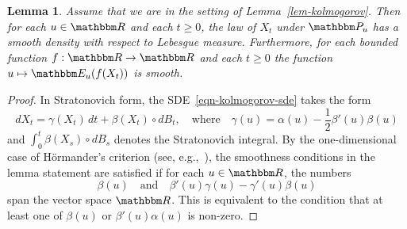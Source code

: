 \documentclass[11pt]{article}
\theoremstyle{plain}
\newtheorem{lem}[thm]{Lemma}
\theoremstyle{definition}
\numberwithin{equation}{section}
\newcommand{\eqb}{\begin{equation}}
\newcommand{\eqe}{\end{equation}}
\newcommand{\eqbn}{\begin{equation*}}
\newcommand{\eqen}{\end{equation*}}
\newcommand{\BB}{\mathbbm}
\newcommand{\rta}{\rightarrow}
\begin{document}
\begin{lem} \label{lem-hormander} 
Assume that we are in the setting of Lemma~\ref{lem-kolmogorov}. 
Then for each $u \in\BB R$ and each $t\geq 0$, the law of $X_t$ under $\BB P_u$ has a smooth density with respect to Lebesgue measure. 
Furthermore, for each bounded function $f : \BB R\rta \BB R$ and each $t\geq 0$ the function $u\mapsto \BB E_u( f(X_t))$ is smooth. 
\end{lem}
\begin{proof}
In Stratonovich form, the SDE~\eqref{eqn-kolmogorov-sde} takes the form
\eqb \label{eqn-stratanovich}
dX_t = \gamma(X_t) \,dt + \beta(X_t) \circ dB_t , \quad \text{where} \quad \gamma(u) =  \alpha(u) - \frac12 \beta'(u) \beta(u)  
\eqe
and $\int_0^t \beta(X_s) \circ dB_s$ denotes the Stratonovich integral. By the one-dimensional case of H\"ormander's criterion (see, e.g.,~\cite[Theorem 1.3]{hairer-hormander}), the smoothness conditions in the lemma statement are satisfied if for each $u \in \BB R$, the numbers
\eqbn
\beta(u)  \quad \text{and} \quad \beta'(u) \gamma(u) - \gamma'(u) \beta(u)   
\eqen
span the vector space $\BB R$. This is equivalent to the condition that at least one of $\beta(u)$ or $\beta'(u) \alpha(u)$ is non-zero. 
\end{proof}
\end{document}
